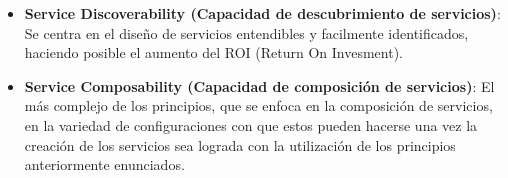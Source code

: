 \begin{itemize}
 \item \textbf{Service Discoverability (Capacidad de descubrimiento de servicios)}: Se centra en el diseño de servicios entendibles y facilmente identificados, haciendo posible el aumento del ROI (Return On Invesment). 

 \item \textbf{Service Composability (Capacidad de composición de servicios)}: El más complejo de los principios, que se enfoca en la composición de servicios, en la variedad de configuraciones con que estos pueden hacerse una vez la creación de los servicios sea lograda con la utilización de los principios anteriormente enunciados.
\end{itemize}

